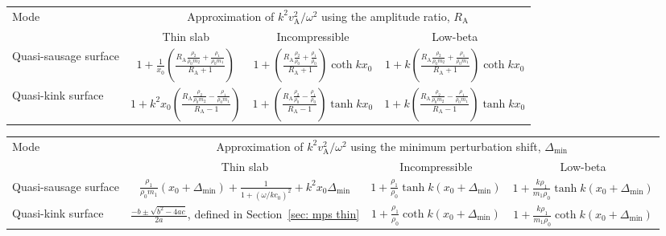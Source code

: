 \begin{sidewaystable}
	\centering
	\begin{tabular}{lccc}
		\toprule
		\smallskip
		Mode & \multicolumn{3}{c}{Approximation of $k^2v_\textrm{A}^2 / \omega^2$ using the amplitude ratio, $R_\textrm{A}$} \\
		& Thin slab & Incompressible & Low-beta \\
		\midrule
		\smallskip
		Quasi-sausage surface & $ 1 + \frac{1}{x_0}\left(\frac{R_\textrm{A}\frac{\rho_2}{\rho_0m_2} + \frac{\rho_1}{\rho_0m_1}}{R_\textrm{A} + 1}\right) $ & $ 1 + \left( \frac{R_\textrm{A} \frac{\rho_2}{\rho_0} + \frac{\rho_1}{\rho_0}}{R_\textrm{A} + 1} \right) \coth{kx_0} $ & $ 1 + k \left( \frac{ R_\textrm{A}\frac{\rho_2}{\rho_0m_2} + \frac{\rho_1}{\rho_0m_1}}{R_\textrm{A} + 1} \right) \coth{kx_0} $ \\
		Quasi-kink surface & $ 1 + k^2x_0\left(\frac{R_\textrm{A}\frac{\rho_2}{\rho_0m_2} - \frac{\rho_1}{\rho_0m_1}}{R_\textrm{A} - 1}\right) $ & $ 1 + \left( \frac{R_\textrm{A} \frac{\rho_2}{\rho_0} - \frac{\rho_1}{\rho_0}}{R_\textrm{A} - 1} \right) \tanh{kx_0} $ & $ 1 + k \left( \frac{ R_\textrm{A}\frac{\rho_2}{\rho_0m_2} - \frac{\rho_1}{\rho_0m_1}}{R_\textrm{A} - 1} \right) \tanh{kx_0} $ \\
		\bottomrule
	\end{tabular}
	\caption{Magneto-seismology inversion using the amplitude ratio, $R_\textrm{A}$, to approximate the Alfv\'{e}n speed, $v_\textrm{A}$.}
	\label{table: amp ratio}

	\bigskip\bigskip\bigskip\bigskip\bigskip

	\begin{tabular}{lccc}
		\toprule
		\smallskip
		Mode & \multicolumn{3}{c}{Approximation of $k^2v_\textrm{A}^2 / \omega^2$ using the minimum perturbation shift, $\Delta_\textrm{min}$} \\
		& Thin slab & Incompressible & Low-beta \\
		\midrule
		\smallskip
		Quasi-sausage surface & $ \frac{\rho_1}{\rho_0m_1}(x_0 + \Delta_\textrm{min}) + \frac{1}{1 + (\omega / kc_0)^2} + k^2x_0\Delta_\textrm{min} $ & $ 1 + \frac{\rho_1}{\rho_0}\tanh{k(x_0 + \Delta_\textrm{min})} $ & $ 1 + \frac{k\rho_1}{m_1\rho_0}\tanh{k(x_0 + \Delta_\textrm{min})} $ \\
		Quasi-kink surface & $\frac{-b \pm \sqrt{b^2 - 4ac}}{2a}$, defined in Section~\ref{sec: mps thin} & $ 1 + \frac{\rho_1}{\rho_0}\coth{k(x_0 + \Delta_\textrm{min})} $ & $ 1 + \frac{k\rho_1}{m_1\rho_0}\coth{k(x_0 + \Delta_\textrm{min})} $ \\
		\bottomrule		
	\end{tabular}
	\caption{Magneto-seismology inversion using the minimum perturbation shift, $\Delta_\textrm{min}$, to approximate the Alfv\'{e}n speed, $v_\textrm{A}$.}
	\label{table: min pert shift}
\end{sidewaystable}


